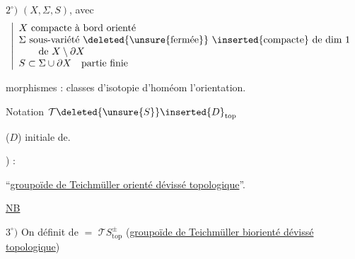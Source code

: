 $2^\circ)$ $(X,\Sigma,S)$, avec
\[
\left|\begin{array}{l}
X\ \text{compacte à bord orienté}\\
\Sigma\ \text{sous-variété \deleted{\unsure{fermée}} \inserted{compacte} de dim $1$}\\
\qquad\text{de }X\setminus\partial X\\
S\subset\Sigma\cup\partial X\quad\text{partie finie}
\end{array}\right.
\]

morphismes : classes d'isotopie d'homéom  l'orientation.

Notation $\mathcal T\deleted{\unsure{S}}\inserted{D}_{\mathrm{top}}$

($D$) initiale de.

) :

``\uline{groupoïde de Teichmüller orienté dévissé topologique}''.

\uline{NB}

$3^\circ)$ On définit de $=$ $\mathcal TS_{\mathrm{top}}^\pm$
(\uline{groupoïde de Teichmüller biorienté dévissé topologique})


